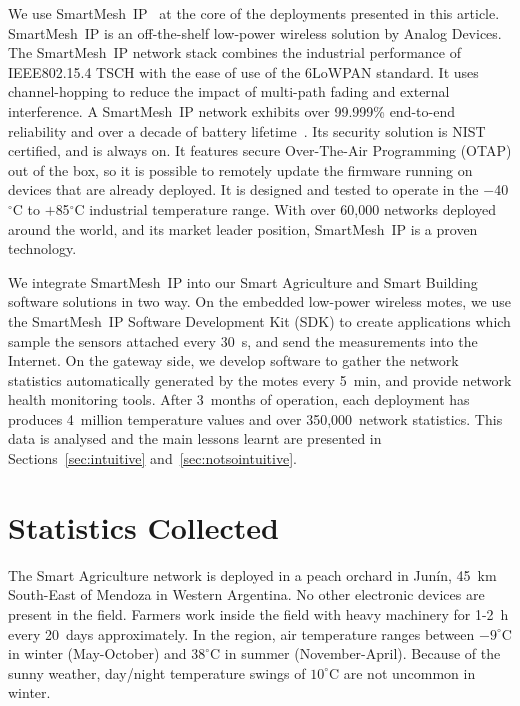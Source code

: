 \documentclass{elsarticle}
\newcommand{\smip}                {SmartMesh~IP\xspace}
\newcommand{\building}            {Smart Building\xspace}
\newcommand{\agri}                {Smart Agriculture\xspace}
\begin{document}

We use \smip~\cite{smip_app_note} at the core of the deployments presented in this article.
\smip is an off-the-shelf low-power wireless solution by Analog Devices.
The \smip network stack combines the industrial performance of IEEE802.15.4 TSCH with the ease of use of the 6LoWPAN standard.
It uses channel-hopping to reduce the impact of multi-path fading and external interference.
A \smip network exhibits over 99.999\% end-to-end reliability and over a decade of battery lifetime~\cite{watteyne10mitigating,watteyne09reliability}.
Its security solution is NIST certified, and is always on.
It features secure Over-The-Air Programming (OTAP) out of the box, so it is possible to remotely update the firmware running on devices that are already deployed.
It is designed and tested to operate in the $-$40$^{\circ}$C to $+$85$^{\circ}$C industrial temperature range.
With over 60,000 networks deployed around the world, and its market leader position, \smip is a proven technology.


We integrate \smip into our \agri and \building software solutions in two way.
On the embedded low-power wireless motes, we use the \smip Software Development Kit (SDK) to create applications which sample the sensors attached every 30~s, and send the measurements into the Internet.
On the gateway side, we develop software to gather the network statistics automatically generated by the motes every 5~min, and provide network health monitoring tools.
After 3~months of operation, each deployment has produces 4~million temperature values and over 350,000~network statistics.
This data is analysed and the main lessons learnt are presented in Sections~\ref{sec:intuitive} and~\ref{sec:notsointuitive}.

\section{Statistics Collected}
\label{sec:collected}


The \agri network is deployed in a peach orchard in Jun\'in, 45~km South-East of Mendoza in Western Argentina.
No other electronic devices are present in the field.
Farmers work inside the field with heavy machinery for 1-2~h every 20~days approximately.
In the region, air temperature ranges between $-9^{\circ}$C in winter (May-October) and $38^{\circ}$C in summer (November-April).
Because of the sunny weather, day/night temperature swings of $10^{\circ}$C are not uncommon in winter.
\end{document}
